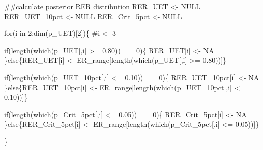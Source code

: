 \documentclass[
  11pt,
]{article}
\newenvironment{Shaded}{}{}
\newcommand{\CommentTok}[1]{\textcolor[rgb]{0.00,0.50,0.00}{#1}}
\newcommand{\ControlFlowTok}[1]{\textcolor[rgb]{0.00,0.00,1.00}{#1}}
\newcommand{\DecValTok}[1]{#1}
\newcommand{\FloatTok}[1]{#1}
\newcommand{\KeywordTok}[1]{\textcolor[rgb]{0.00,0.00,1.00}{#1}}
\newcommand{\NormalTok}[1]{#1}
\newcommand{\OperatorTok}[1]{#1}
\newcommand{\OtherTok}[1]{\textcolor[rgb]{1.00,0.25,0.00}{#1}}
\newcommand{\StringTok}[1]{\textcolor[rgb]{0.00,0.50,0.50}{#1}}
\begin{document}
\begin{Shaded}
\begin{Highlighting}[]
\CommentTok{##calculate posterior RER distribution}
\NormalTok{RER_UET <-}\StringTok{ }\OtherTok{NULL}
\NormalTok{RER_UET_10pct <-}\StringTok{ }\OtherTok{NULL}
\NormalTok{RER_Crit_5pct <-}\StringTok{ }\OtherTok{NULL}

\ControlFlowTok{for}\NormalTok{(i }\ControlFlowTok{in} \DecValTok{2}\OperatorTok{:}\KeywordTok{dim}\NormalTok{(p_UET)[}\DecValTok{2}\NormalTok{])\{}
  \CommentTok{#i <- 3}
  
  \ControlFlowTok{if}\NormalTok{(}\KeywordTok{length}\NormalTok{(}\KeywordTok{which}\NormalTok{(p_UET[,i] }\OperatorTok{>=}\StringTok{ }\FloatTok{0.80}\NormalTok{)) }\OperatorTok{==}\StringTok{ }\DecValTok{0}\NormalTok{)\{}
\NormalTok{    RER_UET[i] <-}\StringTok{ }\OtherTok{NA}
\NormalTok{  \}}\ControlFlowTok{else}\NormalTok{\{RER_UET[i] <-}\StringTok{ }\NormalTok{ER_range[}\KeywordTok{length}\NormalTok{(}\KeywordTok{which}\NormalTok{(p_UET[,i] }\OperatorTok{>=}\StringTok{ }\FloatTok{0.80}\NormalTok{))]\}}
  
  \ControlFlowTok{if}\NormalTok{(}\KeywordTok{length}\NormalTok{(}\KeywordTok{which}\NormalTok{(p_UET_10pct[,i] }\OperatorTok{<=}\StringTok{ }\FloatTok{0.10}\NormalTok{)) }\OperatorTok{==}\StringTok{ }\DecValTok{0}\NormalTok{)\{}
\NormalTok{    RER_UET_10pct[i] <-}\StringTok{ }\OtherTok{NA}
\NormalTok{  \}}\ControlFlowTok{else}\NormalTok{\{RER_UET_10pct[i] <-}\StringTok{ }\NormalTok{ER_range[}\KeywordTok{length}\NormalTok{(}\KeywordTok{which}\NormalTok{(p_UET_10pct[,i] }\OperatorTok{<=}\StringTok{ }\FloatTok{0.10}\NormalTok{))]\}}
  
  \ControlFlowTok{if}\NormalTok{(}\KeywordTok{length}\NormalTok{(}\KeywordTok{which}\NormalTok{(p_Crit_5pct[,i] }\OperatorTok{<=}\StringTok{ }\FloatTok{0.05}\NormalTok{)) }\OperatorTok{==}\StringTok{ }\DecValTok{0}\NormalTok{)\{}
\NormalTok{    RER_Crit_5pct[i] <-}\StringTok{ }\OtherTok{NA}
\NormalTok{  \}}\ControlFlowTok{else}\NormalTok{\{RER_Crit_5pct[i] <-}\StringTok{ }\NormalTok{ER_range[}\KeywordTok{length}\NormalTok{(}\KeywordTok{which}\NormalTok{(p_Crit_5pct[,i] }\OperatorTok{<=}\StringTok{ }\FloatTok{0.05}\NormalTok{))]\}}
  
\NormalTok{\}}
\end{Highlighting}
\end{Shaded}
\end{document}
